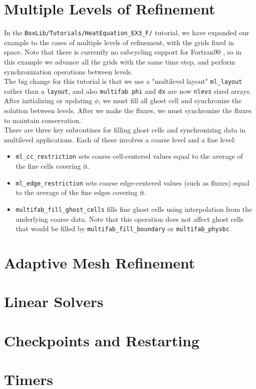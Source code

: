 \section{Multiple Levels of Refinement}\label{Sec:Refinement}
In the {\tt BoxLib/Tutorials/HeatEquation\_EX3\_F/} tutorial, we have expanded our example
to the cases of multiple levels of refinement, with the grids fixed in space.  Note that there is
currently no subcycling support for Fortran90 \BoxLib, so in this example we advance all the grids
with the same time step, and perform synchronization operations between levels.\\

The big change for this tutorial is that we use a "multilevel layout" {\tt ml\_layout} 
rather than a {\tt layout}, and also {\tt multifab phi} and {\tt dx} are now {\tt nlevs} sized arrays.
After initializing or updating $\phi$, we must fill all ghost cell and synchronize the solution between
levels.  After we make the fluxes, we must synchronize the fluxes to maintain conservation.\\

There are three key subroutines for filling ghost cells and synchronizing data in multilevel applications.
Each of these involves a coarse level and a fine level:
\begin{itemize}

\item {\tt ml\_cc\_restriction} sets coarse cell-centered values equal to the average of the fine
  cells covering it.

\item {\tt ml\_edge\_restriction} sets coarse edge-centered values (such as fluxes) equal to the average
  of the fine edges covering it.

\item {\tt multifab\_fill\_ghost\_cells} fills fine ghost cells using interpolation from the underlying coarse
  data.  Note that this operation does not affect ghost cells that would be filled by {\tt multifab\_fill\_boundary}
  or {\tt multifab\_physbc}.

\end{itemize}

\section{Adaptive Mesh Refinement}\label{Sec:AMR}
\section{Linear Solvers}\label{Sec:Linear Solvers}
\section{Checkpoints and Restarting}\label{Sec:Checkpoints}
\section{Timers}\label{Sec:Timers}


